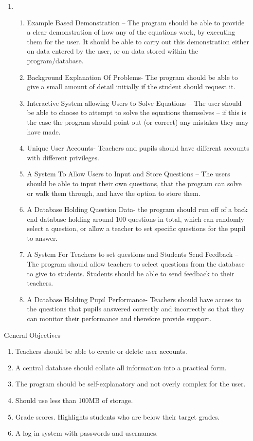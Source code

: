 \documentclass{article}
\begin{document}
\begin{enumerate}
\item \begin{enumerate}
\item Example Based Demonstration -- The program should be able to provide a clear demonstration of how any of the equations work, by executing them for the user. It should be able to carry out this demonstration either on data entered by the user, or on data stored within the program/database.
\item Background Explanation Of Problems- The program should be able to give a small amount of detail initially if the student should request it.
\item Interactive System allowing Users to Solve Equations -- The user should be able to choose to attempt to solve the equations themselves -- if this is the case the program should point out (or correct) any mistakes they may have made.
\item Unique User Accounts- Teachers and pupils should have different accounts with different privileges.
\item A System To Allow Users to Input and Store Questions -- The users should be able to input their own questions, that the program can solve or walk them through, and have the option to store them.
\item A Database Holding Question Data- the program should run off of a back end database holding around 100 questions in total, which can randomly select a question, or allow a teacher to set specific questions for the pupil to answer.
\item A System For Teachers to set questions and Students Send Feedback -- The program should allow teachers to select questions from the database to give to students. Students should be able to send feedback to their teachers.
\item A Database Holding Pupil Performance- Teachers should have access to the questions that pupils answered correctly and incorrectly so that they can monitor their performance and therefore provide support.
\end{enumerate}
\end{enumerate}

\bigskip


\bigskip

General Objectives

\begin{enumerate}
\item Teachers should be able to create or delete user accounts.
\item A central database should collate all information into a practical form.
\item The program should be self-explanatory and not overly complex for the user.
\item Should use less than 100MB of storage.
\item Grade scores. Highlights students who are below their target grades.
\item A log in system with passwords and usernames.
\end{enumerate}
\end{document}
